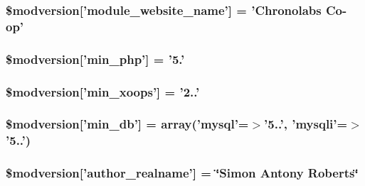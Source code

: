 \hypertarget{xoops__version_8php_a084df2399d3cc8c26eb02e88e08b622c}{
\subsubsection[{\$modversion}]{\setlength{\rightskip}{0pt plus 5cm}\$modversion\mbox{[}'module\-\_\-website\-\_\-name'\mbox{]} = 'Chronolabs Co-\/op'}}\label{xoops__version_8php_a084df2399d3cc8c26eb02e88e08b622c}
\hypertarget{xoops__version_8php_af0bc7d0c4fe87fc42a2f15409ed68875}{
\subsubsection[{\$modversion}]{\setlength{\rightskip}{0pt plus 5cm}\$modversion\mbox{[}'min\-\_\-php'\mbox{]} = '5.'}}\label{xoops__version_8php_af0bc7d0c4fe87fc42a2f15409ed68875}
\hypertarget{xoops__version_8php_a138065f75446a11b4d48364b1f17e788}{
\subsubsection[{\$modversion}]{\setlength{\rightskip}{0pt plus 5cm}\$modversion\mbox{[}'min\-\_\-xoops'\mbox{]} = '2..'}}\label{xoops__version_8php_a138065f75446a11b4d48364b1f17e788}
\hypertarget{xoops__version_8php_a1c2efd68629d51e54fb27c265f7805c9}{
\subsubsection[{\$modversion}]{\setlength{\rightskip}{0pt plus 5cm}\$modversion\mbox{[}'min\-\_\-db'\mbox{]} = array('mysql'=$>$'5..', 'mysqli'=$>$'5..')}}\label{xoops__version_8php_a1c2efd68629d51e54fb27c265f7805c9}
\hypertarget{xoops__version_8php_a42cbe75464ce49a2d4b4021d2723d138}{
\subsubsection[{\$modversion}]{\setlength{\rightskip}{0pt plus 5cm}\$modversion\mbox{[}'author\-\_\-realname'\mbox{]} = \char`\"{}Simon Antony Roberts\char`\"{}}}\label{xoops__version_8php_a42cbe75464ce49a2d4b4021d2723d138}

